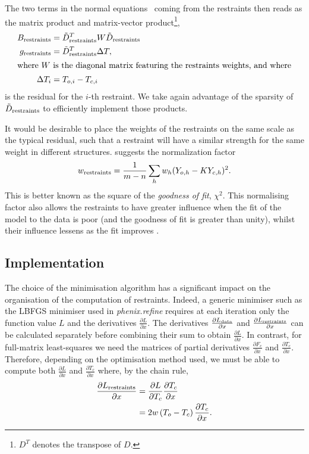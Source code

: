 \documentclass[pdf]{iucr}
\newcommand{\partialder}[2]{\frac{\partial #1}{\partial #2}}
\begin{document}
The two terms in the normal equations~ coming from the restraints then reads as the matrix product and matrix-vector product\footnote{$D^T$ denotes the transpose of $D$.},
\begin{align}
B_{\text{restraints}} &= \tilde{D}_{\text{restraints}}^T W \tilde{D}_{\text{restraints}}\\
g_{\text{restraints}} &= \tilde{D}_{\text{restraints}}^T \Delta T,\\
\shortintertext{where $W$ is the diagonal matrix featuring the restraints weights, and where}
\Delta T_i &= T_{o,i} - T_{c,i}
\end{align}
is the residual for the $i$-th restraint. We take again advantage of the sparsity of $\tilde{D}_{\text{restraints}}$ to efficiently implement those products.

It would be desirable to place the weights of the restraints on the same scale as the typical residual, such that a restraint will have a similar strength for the same weight in different structures.  suggests the normalization factor
\begin{equation}
w_{\text{restraints}} = \frac{1}{m-n} \sum_{h}{ w_h (Y_{o,h} - K Y_{c,h})^2}.
\label{eqn:giacovazzo_normalisation}
\end{equation}
This is better known as the square of the \emph{goodness of fit}, $\chi^2$. This normalising factor also allows the restraints to have greater influence when the fit of the model to the data is poor (and the goodness of fit is greater than unity), whilst their influence lessens as the fit improves .

\subsection{Implementation}

The choice of the minimisation algorithm has a significant impact on the organisation of the computation of restraints. Indeed, a generic minimiser such as the LBFGS minimiser used in \emph{phenix.refine}  requires at each iteration only the function value $L$ and the derivatives $\partialder{L}{x}$. The derivatives $\partialder{L_\data}{x}$ and $\partialder{L_\restraints}{x}$ can be calculated separately before combining their sum to obtain $\partialder{L}{x}$. In contrast, for full-matrix least-squares we need the matrices of partial derivatives $\partialder{F_c}{x}$ and $\partialder{T_c}{x}$. Therefore, depending on the optimisation method used, we must be able to compute both $\partialder{L}{x}$ and $\partialder{T_c}{x}$ where, by the chain rule,
\begin{align}
\partialder{L_\restraints}{x} &= \partialder{L}{T_c} \partialder{T_c}{x} \nonumber\\
                             &= 2 w \left(T_o - T_c \right) \partialder{T_c}{x}.
\end{align}
\end{document}
